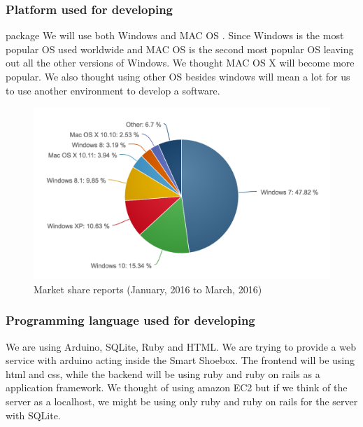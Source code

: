 \documentclass[conference]{IEEEtran}
\begin{document}
\subsubsection{Platform used for developing}package
 We will use both Windows and MAC OS . Since Windows is the most popular OS used worldwide and MAC OS is the second most popular OS leaving out all the other versions of Windows. We thought MAC OS X will become more popular. We also thought using other OS besides windows will mean a lot for us to use another environment to develop a software.
\begin{figure}[H]
\begin{center}
    \includegraphics[scale=0.45]{marketshare}
    \caption{Market share reports (January, 2016 to March, 2016)} \label{fig:label}
\end{center}
\end{figure}

\subsubsection{Programming language used for developing}
We are using Arduino, SQLite, Ruby and HTML. We are trying to provide a web service with arduino acting inside the Smart Shoebox. The frontend will be using html and css, while the backend will be using ruby and ruby on rails as a application framework. We thought of using amazon EC2 but if we think of the server as a localhost, we might be using only ruby and ruby on rails for the server with SQLite.
\end{document}
